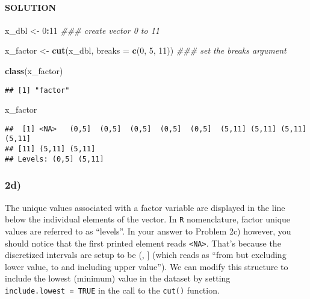 \documentclass[]{article}
\newenvironment{Shaded}{\begin{snugshade}}{\end{snugshade}}
\newcommand{\CommentTok}[1]{\textcolor[rgb]{0.56,0.35,0.01}{\textit{#1}}}
\newcommand{\DataTypeTok}[1]{\textcolor[rgb]{0.13,0.29,0.53}{#1}}
\newcommand{\DecValTok}[1]{\textcolor[rgb]{0.00,0.00,0.81}{#1}}
\newcommand{\KeywordTok}[1]{\textcolor[rgb]{0.13,0.29,0.53}{\textbf{#1}}}
\newcommand{\NormalTok}[1]{#1}
\newcommand{\OperatorTok}[1]{\textcolor[rgb]{0.81,0.36,0.00}{\textbf{#1}}}
\newcommand{\StringTok}[1]{\textcolor[rgb]{0.31,0.60,0.02}{#1}}
\let\oldparagraph\paragraph
\renewcommand{\paragraph}[1]{\oldparagraph{#1}\mbox{}}
\begin{document}
\hypertarget{solution-7}{%
\paragraph{SOLUTION}\label{solution-7}}

\begin{Shaded}
\begin{Highlighting}[]
\NormalTok{x_dbl <-}\StringTok{ }\DecValTok{0}\OperatorTok{:}\DecValTok{11} \CommentTok{### create vector 0 to 11}
  
\NormalTok{x_factor <-}\StringTok{ }\KeywordTok{cut}\NormalTok{(x_dbl, }\DataTypeTok{breaks =} \KeywordTok{c}\NormalTok{(}\DecValTok{0}\NormalTok{, }\DecValTok{5}\NormalTok{, }\DecValTok{11}\NormalTok{)) }\CommentTok{### set the breaks argument}

\KeywordTok{class}\NormalTok{(x_factor)}
\end{Highlighting}
\end{Shaded}

\begin{verbatim}
## [1] "factor"
\end{verbatim}

\begin{Shaded}
\begin{Highlighting}[]
\NormalTok{x_factor}
\end{Highlighting}
\end{Shaded}

\begin{verbatim}
##  [1] <NA>   (0,5]  (0,5]  (0,5]  (0,5]  (0,5]  (5,11] (5,11] (5,11] (5,11]
## [11] (5,11] (5,11]
## Levels: (0,5] (5,11]
\end{verbatim}

\hypertarget{d-1}{%
\subsubsection{2d)}\label{d-1}}

The unique values associated with a factor variable are displayed in the
line below the individual elements of the vector. In \texttt{R}
nomenclature, factor unique values are referred to as ``levels''. In
your answer to Problem 2c) however, you should notice that the first
printed element reads \texttt{\textless{}NA\textgreater{}}. That's
because the discretized intervals are setup to be (, {]} (which reads as
``from but excluding lower value, to and including upper value''). We
can modify this structure to include the lowest (minimum) value in the
dataset by setting \texttt{include.lowest\ =\ TRUE} in the call to the
\texttt{cut()} function.
\end{document}
